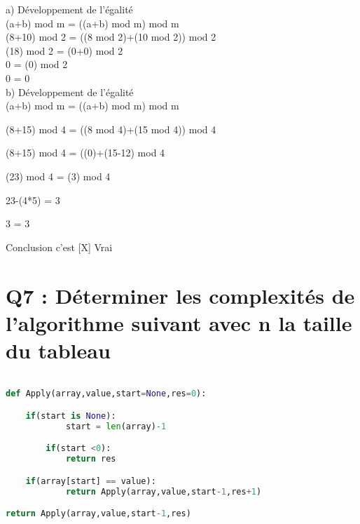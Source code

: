 a) Développement de l'égalité \\

(a+b) mod m = ((a+b) mod m) mod m \\

(8+10) mod 2 = ((8 mod 2)+(10 mod 2)) mod 2 \\

(18) mod 2 = (0+0) mod 2 \\

0 = (0) mod 2 \\

0 = 0 \\

b) Développement de l'égalité \\

(a+b) mod m = ((a+b) mod m) mod m

(8+15) mod 4 = ((8 mod 4)+(15 mod 4)) mod 4

(8+15) mod 4 = ((0)+(15-12) mod 4

(23) mod 4 = (3) mod 4

23-(4*5) = 3

3 = 3

\vspace{4mm} %

Conclusion c'est [X] Vrai \\


\newpage
\section{Q7 : Déterminer les complexités de l’algorithme suivant avec n la taille du tableau}

\vspace{5mm} %

\begin{lstlisting}[language=Python, caption=Python algorithme]

def Apply(array,value,start=None,res=0):

	if(start is None):
            start = len(array)-1

        if(start <0):
            return res

	if(array[start] == value):
            return Apply(array,value,start-1,res+1)

return Apply(array,value,start-1,res)
\end{lstlisting}

\vspace{5mm} %

